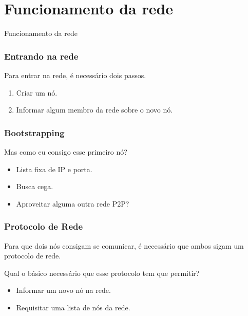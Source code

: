 \documentclass[brazil]{beamer}
\begin{document}
\section{Funcionamento da rede}
\begin{frame}
  \begin{center}
    \huge{Funcionamento da rede}
  \end{center}
\end{frame}
\begin{frame}
  \frametitle{Entrando na rede}
  Para entrar na rede, é necessário dois passos.
  \pause
  \begin{enumerate}
    \item Criar um nó.
    \pause
    \item Informar algum membro da rede sobre o novo nó.
  \end{enumerate}
\end{frame}
\begin{frame}
  \frametitle{Bootstrapping}
  
  Mas como eu consigo esse primeiro nó?
  \vspace{20pt}
  \pause
  \begin{itemize}
    \item Lista fixa de IP e porta.
    \pause
    \item Busca cega.
    \pause
    \item Aproveitar alguma outra rede P2P?
  \end{itemize}
\end{frame}
\begin{frame}
  \frametitle{Protocolo de Rede}
  
  Para que dois nós consigam se comunicar, é necessário que ambos sigam um protocolo de rede.
  
  \vspace{20pt}
  \pause
  
  Qual o básico necessário que esse protocolo tem que permitir?
  \begin{itemize}
    \pause
    \item Informar um novo nó na rede.
    \pause
    \item Requisitar uma lista de nós da rede.
  \end{itemize}
\end{frame}
\end{document}
